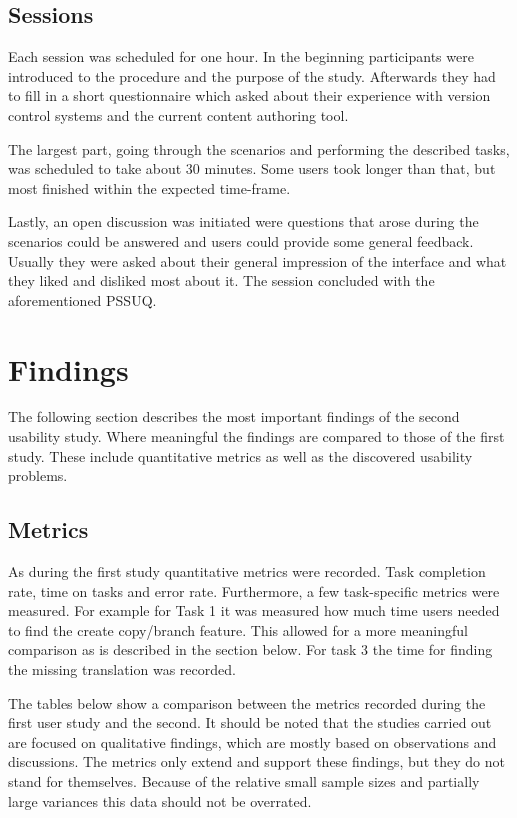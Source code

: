 \subsection{Sessions}
Each session was scheduled for one hour. In the beginning participants were introduced to the procedure and the purpose of the study. Afterwards they had to fill in a short questionnaire which asked about their experience with version control systems and the current content authoring tool.

The largest part, going through the scenarios and performing the described tasks, was scheduled to take about 30 minutes. Some users took longer than that, but most finished within the expected time-frame.

Lastly, an open discussion was initiated were questions that arose during the scenarios could be answered and users could provide some general feedback. Usually they were asked about their general impression of the interface and what they liked and disliked most about it. The session concluded with the aforementioned PSSUQ.

\section{Findings}
The following section describes the most important findings of the second usability study. Where meaningful the findings are compared to those of the first study. These include quantitative metrics as well as the discovered usability problems.

\subsection{Metrics}
As during the first study quantitative metrics were recorded. Task completion rate, time on tasks and error rate. Furthermore, a few task-specific metrics were measured. For example for Task 1 it was measured how much time users needed to find the create copy/branch feature. This allowed for a more meaningful comparison as is described in the section below. For task 3 the time for finding the missing translation was recorded.

The tables below show a comparison between the metrics recorded during the first user study and the second. It should be noted that the studies carried out are focused on qualitative findings, which are mostly based on observations and discussions. The metrics only extend and support these findings, but they do not stand for themselves. Because of the relative small sample sizes and partially large variances this data should not be overrated.

